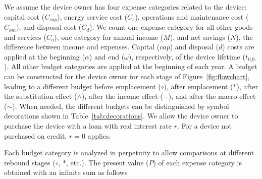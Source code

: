 
We assume the device owner has four expense categories 
related to the device:
capital cost ($C_{cap}$), 
energy service cost ($C_s$), 
operations and maintenance cost ($C_{om}$), and
disposal cost ($C_d$).
We count one expense category for all other
goods and services ($C_o$),
one category for annual income ($M$), and 
net savings ($N$), 
the difference between income and expenses.
Capital ($cap$) and disposal ($d$) costs are applied
at the beginning ($\alpha$) and end ($\omega$), respectively, 
of the device lifetime ($t_{life}$).
All other budget categories are 
applied at the beginning of each year.
A budget can be constructed for the device owner for each stage
of Figure~\ref{fig:flowchart}, 
leading to a different budget 
before emplacement ($\circ$), 
after emplacement ($*$), 
after the substitution effect ($\wedge$), 
after the income effect ($-$), and 
after the macro effect ($\sim$).
When needed, 
the different budgets can be distinguished by symbol decorations
shown in Table~\ref{tab:decorations}.
We allow the device owner to purchase the device 
with a loan with real interest rate $r$.
For a device not purchased on credit,
$r = 0$ applies.

Each budget category is analyzed in perpetuity
to allow comparisons at different rebound stages 
($\circ$, $*$, etc.).
The present value ($P$) of each expense category is obtained
with an infinite sum as follows

